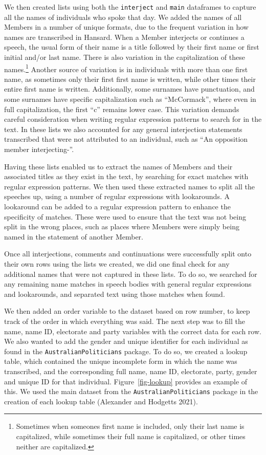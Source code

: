 \documentclass[
  letterpaper,
  DIV=11,
  numbers=noendperiod]{scrartcl}
\begin{document}
We then created lists using both the \texttt{interject} and
\texttt{main} dataframes to capture all the names of individuals who
spoke that day. We added the names of all Members in a number of unique
formats, due to the frequent variation in how names are transcribed in
Hansard. When a Member interjects or continues a speech, the usual form
of their name is a title followed by their first name or first initial
and/or last name. There is also variation in the capitalization of these
names.\footnote{Sometimes when someones first name is included, only
  their last name is capitalized, while sometimes their full name is
  capitalized, or other times neither are capitalized.} Another source
of variation is in individuals with more than one first name, as
sometimes only their first first name is written, while other times
their entire first name is written. Additionally, some surnames have
punctuation, and some surnames have specific capitalization such as
``McCormack'', where even in full capitalization, the first ``c''
remains lower case. This variation demands careful consideration when
writing regular expression patterns to search for in the text. In these
lists we also accounted for any general interjection statements
transcribed that were not attributed to an individual, such as ``An
opposition member interjecting-''.

Having these lists enabled us to extract the names of Members and their
associated titles as they exist in the text, by searching for exact
matches with regular expression patterns. We then used these extracted
names to split all the speeches up, using a number of regular
expressions with lookarounds. A lookaround can be added to a regular
expression pattern to enhance the specificity of matches. These were
used to ensure that the text was not being split in the wrong places,
such as places where Members were simply being named in the statement of
another Member.

Once all interjections, comments and continuations were successfully
split onto their own rows using the lists we created, we did one final
check for any additional names that were not captured in these lists. To
do so, we searched for any remaining name matches in speech bodies with
general regular expressions and lookarounds, and separated text using
those matches when found.

We then added an order variable to the dataset based on row number, to
keep track of the order in which everything was said. The next step was
to fill the name, name ID, electorate and party variables with the
correct data for each row. We also wanted to add the gender and unique
identifier for each individual as found in the
\texttt{AustralianPoliticians} package. To do so, we created a lookup
table, which contained the unique incomplete form in which the name was
transcribed, and the corresponding full name, name ID, electorate,
party, gender and unique ID for that individual. Figure~\ref{fig-lookup}
provides an example of this. We used the main dataset from the
\texttt{AustralianPoliticians} package in the creation of each lookup
table (Alexander and Hodgetts 2021).
\end{document}
